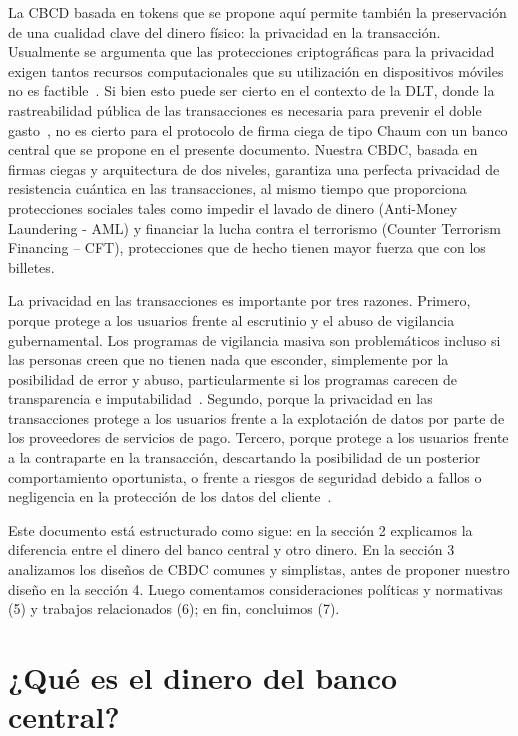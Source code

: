 \documentclass[a4paper,10pt]{article} %
\begin{document}
La CBCD basada en tokens que se propone aquí permite también la
preservación de una cualidad clave del dinero físico: la privacidad en
la transacción. Usualmente se argumenta que las protecciones
criptográficas para la privacidad exigen tantos recursos computacionales
que su utilización en dispositivos móviles no es factible~\cite[véase][]{Allen}.
Si bien esto puede ser cierto en el contexto de la DLT,
donde la rastreabilidad pública de las transacciones es necesaria para
prevenir el doble gasto~\cite{Narayanan}, no es cierto para el
protocolo de firma ciega de tipo Chaum con un banco central que se
propone en el presente documento. Nuestra CBDC, basada en firmas ciegas
y arquitectura de dos niveles, garantiza una perfecta privacidad de
resistencia cuántica en las transacciones, al mismo tiempo que
proporciona protecciones sociales tales como impedir el lavado de dinero
(Anti-Money Laundering - AML) y financiar la lucha contra el terrorismo
(Counter Terrorism Financing -- CFT), protecciones que de hecho tienen
mayor fuerza que con los billetes.

La privacidad en las transacciones es importante por tres razones.
Primero, porque protege a los usuarios frente al escrutinio y el abuso
de vigilancia gubernamental. Los programas de vigilancia masiva son
problemáticos incluso si las personas creen que no tienen nada que
esconder, simplemente por la posibilidad de error y abuso,
particularmente si los programas carecen de transparencia e
imputabilidad~\cite[véase][]{Solove}. Segundo, porque la privacidad en las
transacciones protege a los usuarios frente a la explotación de datos por parte
de los proveedores de servicios de pago.
Tercero, porque protege a los usuarios frente a la contraparte en la
transacción, descartando la posibilidad de un posterior comportamiento
oportunista, o frente a riesgos de seguridad debido a fallos o
negligencia en la protección de los datos del cliente~\cite[véase][]{Kahn2005}.

Este documento está estructurado como sigue: en la sección 2 explicamos
la diferencia entre el dinero del banco central y otro dinero. En la
sección 3 analizamos los diseños de CBDC comunes y simplistas, antes
de proponer nuestro diseño en la sección 4. Luego comentamos
consideraciones políticas y normativas (5) y trabajos relacionados (6);
en fin, concluimos (7).


\section{¿Qué es el dinero del banco central?}
        \label{2.-quuxe9-es-el-dinero-del-banco-central}
\end{document}
